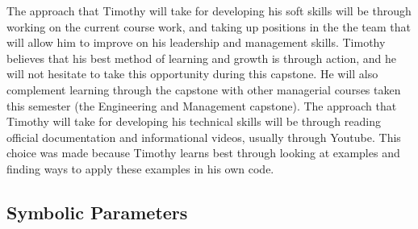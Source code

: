 \documentclass[12pt]{article}
\begin{document}
\begin{enumerate}
	      The approach that Timothy will take for developing his soft skills will be through working on the
	      current course work, and taking up positions in the the team that will allow him to improve on his
	      leadership and management skills. Timothy believes that his best method of learning and growth is
	      through action, and he will not hesitate to take this opportunity during this capstone. He will
	      also complement learning through the capstone with other managerial courses taken this semester
	      (the Engineering and Management capstone). The approach that Timothy will take for developing his
	      technical skills will be through reading official documentation and informational videos, usually
	      through Youtube. This choice was made because Timothy learns best through looking at examples and
	      finding ways to apply these examples in his own code.

\end{enumerate}

\subsection{Symbolic Parameters}

\end{document}
